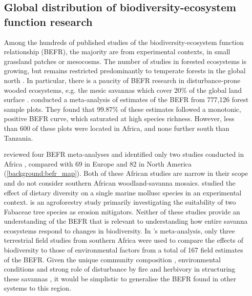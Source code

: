 \begin{refsection}
\subsection{Global distribution of biodiversity-ecosystem function research}
\label{background:ssec:befr_global}

Among the hundreds of published studies of the biodiversity-ecosystem function relationship (BEFR), the majority are from experimental contexts, in small grassland patches or mesocosms. The number of studies in forested ecosystems is growing, but remains restricted predominantly to temperate forests in the global north \citep{Clarke2017}. In particular, there is a paucity of BEFR research in disturbance-prone wooded ecosystems, e.g. the mesic savannas which cover \textapprox{}20\% of the global land surface \citep{Scholes1993}. \citet{Liang2016} conducted a meta-analysis of estimates of the BEFR from 777,126 forest sample plots. They found that 99.87\% of these estimates followed a monotonic, positive BEFR curve, which saturated at high species richness. However, less than 600 of these plots were located in Africa, and none further south than Tanzania. 

\citet{Clarke2017} reviewed four BEFR meta-analyses \citep{Gamfeldt2015, Griffin2013a, Zhang2012, Cardinale2009} and identified only two studies conducted in Africa \citep{Foster1999, Burleigh1997}, compared with 69 in Europe and 82 in North America (\autoref{background:befr_map}). Both of these African studies are narrow in their scope and do not consider southern African woodland-savanna mosaics. \citet{Foster1999} studied the effect of dietary diversity on a single marine mollusc species in an experimental context. \citet{Burleigh1997} is an agroforestry study primarily investigating the suitability of two Fabaceae tree species as erosion mitigators. Neither of these studies provide an understanding of the BEFR that is relevant to understanding how entire savanna ecosystems respond to changes in biodiversity. In \citeauthor{Duffy2017}'s \citeyearpar{Duffy2017} meta-analysis, only three terrestrial field studies from southern Africa were used to compare the effects of biodiversity to those of environmental factors from a total of 167 field estimates of the BEFR. Given the unique community composition \citep{Lehmann2011}, environmental conditions \citep{Linder2003} and strong role of disturbance by fire and herbivory in structuring these savannas \citep{Staver2011}, it would be simplistic to generalise the BEFR found in other systems to this region.


\end{refsection}
